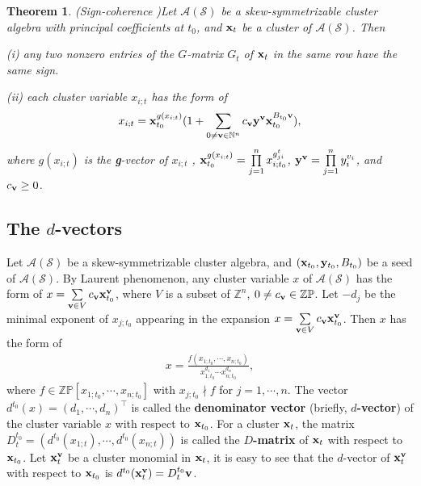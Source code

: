 \documentclass[14pt]{amsart}
\newtheorem{Theorem}{Theorem}[section]
\begin{document}
\begin{Theorem}(Sign-coherence \cite{GHKK})\label{thmfg} Let $\mathcal A(\mathcal S)$ be a skew-symmetrizable cluster algebra with principal coefficients at $t_0$, and ${\bf x}_t$ be a cluster of $\mathcal A(\mathcal S)$. Then

(i) any two nonzero entries of the $G$-matrix $G_t$ of ${\bf x}_t$ in the same row have the same sign.

(ii)  each cluster variable $x_{i;t}$  has the form of
\begin{equation}\label{gvectorsign}
x_{i;t}={\bf x}_{t_0}^{g(x_{i;t})}(1+\sum\limits_{0\neq {\bf v}\in\mathbb N^n}c_{\bf v}{\bf y}^{\bf v}{\bf x}_{t_0}^{B_{t_0}{\bf v}})\nonumber,
\end{equation}
where $g(x_{i;t})$ is the {\bf g}-vector of $x_{i;t}$ , ${\bf x}_{t_0}^{g(x_{i;t})}=\prod\limits_{j=1}^nx_{i;t_0}^{g_{ji}^t}$, ${\bf y}^{\bf v}=\prod\limits_{j=1}^ny_i^{v_i}$, and $c_{\bf v}\geq 0$.
\end{Theorem}




\subsection{The $d$-vectors}
  Let $\mathcal A(\mathcal S)$ be a skew-symmetrizable cluster algebra, and $({\bf x}_{t_0}, {\bf y}_{t_0}, B_{t_0})$ be a seed of  $\mathcal A(\mathcal S)$. By Laurent phenomenon,  any cluster variable $x$ of $\mathcal A(\mathcal S)$ has the form of $x=\sum\limits_{{\bf v}\in V} c_{\bf v}{\bf x}_{t_0}^{\bf v}$, where $V$ is a subset of $\mathbb Z^n$, $0\neq c_{\bf v}\in \mathbb {ZP}$. Let $-d_{j}$ be the minimal exponent of $x_{j;t_0}$ appearing in the expansion $x=\sum\limits_{{\bf v}\in V} c_{\bf v}{\bf x}_{t_0}^{\bf v}$. Then $x$ has the form of
\begin{eqnarray}
\label{eqd}x=\frac{f(x_{1;t_0},\cdots,x_{n;t_0})}{x_{1;t_0}^{d_1}\cdots x_{n;t_0}^{d_n}},
\end{eqnarray}
where $f\in\mathbb {ZP}[x_{1;t_0},\cdots,x_{n;t_0}]$ with  $x_{j;t_0}\nmid f$ for $j=1,\cdots,n$.
The vector $d^{t_0}(x) = (d_1,\cdots, d_n)^{\top}$ is called the {\bf denominator vector} (briefly, {\bf $d$-vector})  of the cluster variable $x$ with respect to ${\bf x}_{t_0}$. For a cluster ${\bf x}_t$, the matrix $D_t^{t_0}=(d^{t_0}(x_{1;t}),\cdots,d^{t_0}(x_{n;t}))$ is called the {\bf $D$-matrix} of ${\bf x}_t$ with respect to ${\bf x}_{t_0}$.
Let ${\bf x}_t^{\bf v}$ be a cluster monomial in ${\bf x}_t$, it is easy to see that the $d$-vector of ${\bf x}_t^{\bf v}$ with respect to ${\bf x}_{t_0}$ is $d^{t_0}({\bf x}_t^{\bf v})=D_t^{t_0}{\bf v}$.
\end{document}

